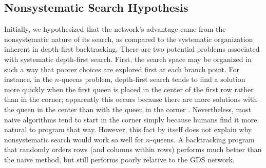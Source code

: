 \vspace*{-0.05in}
\subsection{Nonsystematic Search Hypothesis}
\vspace*{-0.05in}

Initially, we hypothesized that the network's advantage came from the
nonsystematic nature of its search, as compared to the systematic
organization inherent in depth-first backtracking. There are two
potential problems associated with systematic depth-first search.
First, the search space may be organized in such a way that poorer
choices are explored first at each branch point.  For instance, in the
$n$-queens problem, depth-first search tends to find a solution more
quickly when the first queen is placed in the center of the first row
rather than in the corner; apparently this occurs because
there are more solutions with the
queen in the center than with the queen in the corner \cite{stones}.
Nevertheless,
most naive algorithms tend to start in the corner simply because
humans find it more natural to program that way.  However, this fact
by itself does not explain why nonsystematic search would work so well
for $n$-queens.  A backtracking program that randomly orders rows (and
columns within rows) performs much better than the naive method, but
still performs poorly relative to the GDS network.

